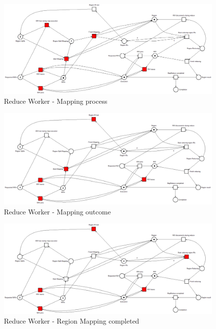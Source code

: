 \begin{figure}[!ht]
    \centering
    \includegraphics[width=\linewidth]{document/chapters/chapter_6/images/master_petri_net_3.png}
    \caption{Reduce Worker - Mapping process}
    \label{fig:master_petri_net_3}
\end{figure}

\begin{figure}[!ht]
    \centering
    \includegraphics[width=\linewidth]{document/chapters/chapter_6/images/master_petri_net_4.png}
    \caption{Reduce Worker - Mapping outcome}
    \label{fig:master_petri_net_4}
\end{figure}

\begin{figure}[!ht]
    \centering
    \includegraphics[width=\linewidth]{document/chapters/chapter_6/images/master_petri_net_5.png}
    \caption{Reduce Worker - Region Mapping completed}
    \label{fig:master_petri_net_5}
\end{figure}

